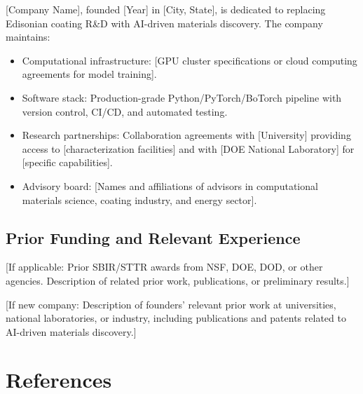 \documentclass[11pt,letterpaper]{article}
\begin{document}
[Company Name], founded [Year] in [City, State], is dedicated to replacing Edisonian coating R\&D with AI-driven materials discovery. The company maintains:

\begin{itemize}[noitemsep]
  \item Computational infrastructure: [GPU cluster specifications or cloud computing agreements for model training].
  \item Software stack: Production-grade Python/PyTorch/BoTorch pipeline with version control, CI/CD, and automated testing.
  \item Research partnerships: Collaboration agreements with [University] providing access to [characterization facilities] and with [DOE National Laboratory] for [specific capabilities].
  \item Advisory board: [Names and affiliations of advisors in computational materials science, coating industry, and energy sector].
\end{itemize}

\subsection{Prior Funding and Relevant Experience}

[If applicable: Prior SBIR/STTR awards from NSF, DOE, DOD, or other agencies. Description of related prior work, publications, or preliminary results.]

[If new company: Description of founders' relevant prior work at universities, national laboratories, or industry, including publications and patents related to AI-driven materials discovery.]

\section{References}
\label{sec:references}
\end{document}
